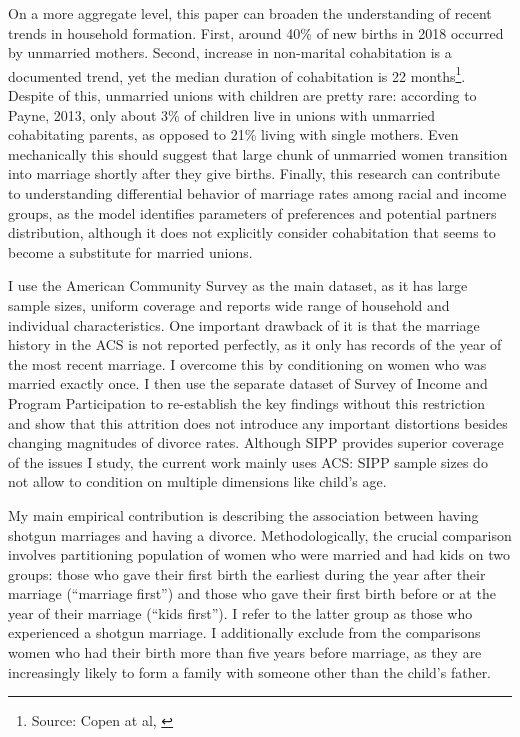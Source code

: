 \documentclass[12pt,letter]{article}
\begin{document}
On a more aggregate level, this paper can broaden the understanding of recent trends in household formation. First, around 40\% of new births in 2018 occurred by unmarried mothers. Second, increase in non-marital cohabitation is a documented trend, yet the median duration of cohabitation is 22 months\footnote{Source: Copen at al,  \cite{copen}}. Despite of this, unmarried unions with children are pretty rare: according to Payne, 2013\nocite{payne}, only about 3\% of children live in unions with unmarried cohabitating parents, as opposed to 21\% living with single mothers. Even mechanically this should suggest that large chunk of unmarried women transition into marriage shortly after they give births. Finally, this research can contribute to understanding differential behavior of marriage rates among racial and income groups, as the model identifies parameters of preferences and potential partners distribution, although it does not explicitly consider cohabitation that seems to become a substitute for married unions.

I use the American Community Survey as the main dataset, as it has large sample sizes, uniform coverage and reports wide range of household and individual characteristics. One important drawback of it is that the marriage history in the ACS is not reported perfectly, as it only has records of the year of the most recent marriage. I overcome this by conditioning on women who was married exactly once. I then use the separate dataset of Survey of Income and Program Participation to re-establish the key findings without this restriction and show that this attrition does not introduce any important distortions besides changing magnitudes of divorce rates. Although SIPP provides superior coverage of the issues I study, the current work mainly uses ACS: SIPP sample sizes do not allow to condition on multiple dimensions like child's age. 

My main empirical contribution is describing the association between having shotgun marriages and having a divorce. Methodologically, the crucial comparison involves partitioning population of women who were married and had kids on two groups:  those who gave their first birth the earliest during the year after their marriage (``marriage first'') and those who gave their first birth before or at the year of their marriage (``kids first''). I refer to the latter group as those who experienced a shotgun marriage. I additionally exclude from the comparisons women who had their birth more than five years before marriage, as they are increasingly likely to form a family with someone other than the child's father. 
\end{document}
